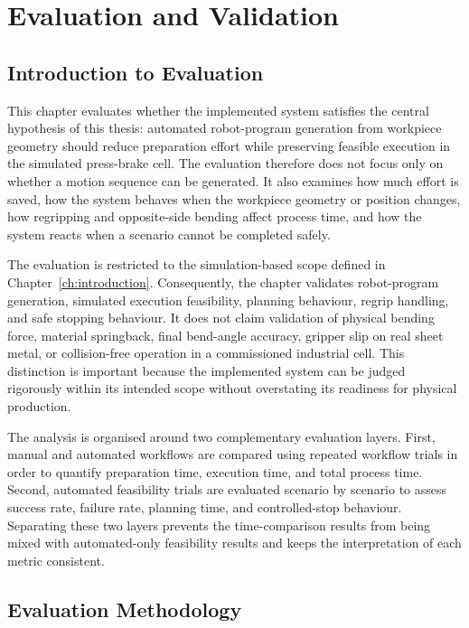 \chapter{Evaluation and Validation}
\label{ch:evaluation-validation}

\section{Introduction to Evaluation}
\label{sec:evaluation-introduction}

This chapter evaluates whether the implemented system satisfies the central hypothesis of this thesis: automated robot-program generation from workpiece geometry should reduce preparation effort while preserving feasible execution in the simulated press-brake cell. The evaluation therefore does not focus only on whether a motion sequence can be generated. It also examines how much effort is saved, how the system behaves when the workpiece geometry or position changes, how regripping and opposite-side bending affect process time, and how the system reacts when a scenario cannot be completed safely.

The evaluation is restricted to the simulation-based scope defined in Chapter~\ref{ch:introduction}. Consequently, the chapter validates robot-program generation, simulated execution feasibility, planning behaviour, regrip handling, and safe stopping behaviour. It does not claim validation of physical bending force, material springback, final bend-angle accuracy, gripper slip on real sheet metal, or collision-free operation in a commissioned industrial cell. This distinction is important because the implemented system can be judged rigorously within its intended scope without overstating its readiness for physical production.

The analysis is organised around two complementary evaluation layers. First, manual and automated workflows are compared using repeated workflow trials in order to quantify preparation time, execution time, and total process time. Second, automated feasibility trials are evaluated scenario by scenario to assess success rate, failure rate, planning time, and controlled-stop behaviour. Separating these two layers prevents the time-comparison results from being mixed with automated-only feasibility results and keeps the interpretation of each metric consistent.

\section{Evaluation Methodology}
\label{sec:evaluation-methodology}

